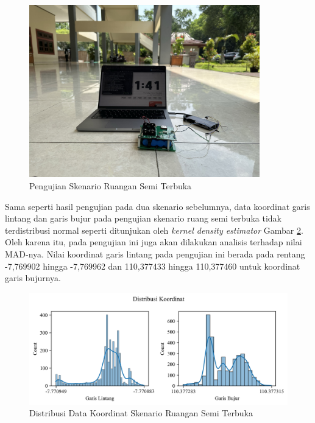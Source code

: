 \begin{figure}[H]
	\centering
	\includegraphics[width=10cm]{contents/chapter-4/3-skenario-semioutdoor/keadaan.jpeg}
	\caption{Pengujian Skenario Ruangan Semi Terbuka}
	\label{Fig: semioutdoor-keadaan}
\end{figure}

Sama seperti hasil pengujian pada dua skenario sebelumnya, data koordinat garis lintang dan garis bujur pada pengujian skenario ruang semi terbuka tidak terdistribusi normal seperti ditunjukan oleh \textit{kernel density estimator} Gambar \ref{Fig:semioutdoor-distribution}. Oleh karena itu, pada pengujian ini juga akan dilakukan analisis terhadap nilai MAD-nya. Nilai koordinat garis lintang pada pengujian ini berada pada rentang -7,769902 hingga -7,769962 dan 110,377433 hingga 110,377460 untuk koordinat garis bujurnya.

\begin{figure}[H]
	\centering
	\begin{adjustbox}{width=\textwidth}
		\includegraphics{contents/chapter-4/3-skenario-semioutdoor/distribution.png}
	\end{adjustbox}
	\caption{Distribusi Data Koordinat Skenario Ruangan Semi Terbuka}
	\label{Fig:semioutdoor-distribution}
\end{figure}

